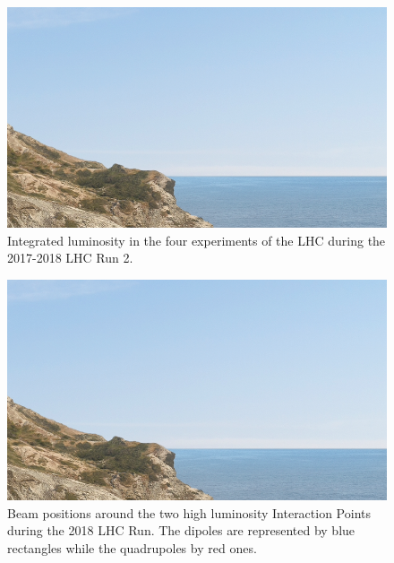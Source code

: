 \begin{figure}[h]
  \centering
  \includegraphics[width=0.5\linewidth]{Figures/placeholder.png}
  \caption{Integrated luminosity in the four experiments of the LHC during the 2017-2018 LHC Run 2.}
  \label{figure:run_II_luminosities}
\end{figure}



\begin{figure}[h]
  \centering
  \includegraphics[width=0.5\linewidth]{Figures/placeholder.png}
  \caption{Beam positions around the two high luminosity Interaction Points during the 2018 LHC Run. The dipoles are represented by blue rectangles while the quadrupoles by red ones.}
  \label{figure:ir1_ir5_beam_positions}
\end{figure}

